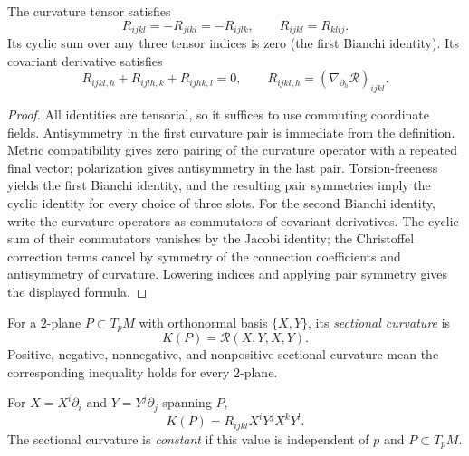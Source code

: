 \begin{lemma}
\label{claim:curvature-symmetries-bianchi}
\leanok
\label{Bianchi}



The curvature tensor satisfies
\[
  R_{ijkl}=-R_{jikl}=-R_{ijlk},
  \qquad R_{ijkl}=R_{klij}.
\]
Its cyclic sum over any three tensor indices is zero (the first Bianchi
identity). Its covariant derivative satisfies
\[
  R_{ijkl,h}+R_{ijlh,k}+R_{ijhk,l}=0,
  \qquad
  R_{ijkl,h}=(\nabla_{\partial_h}\mathcal R)_{ijkl}.
\]
\end{lemma}

\begin{proof}
\sketch
{}
\leanok
All identities are tensorial, so it suffices to use commuting coordinate fields. Antisymmetry in the first curvature pair is immediate from the definition. Metric compatibility gives zero pairing of the curvature operator with a repeated final vector; polarization gives antisymmetry in the last pair. Torsion-freeness yields the first Bianchi identity, and the resulting pair symmetries imply the cyclic identity for every choice of three slots. For the second Bianchi identity, write the curvature operators as commutators of covariant derivatives. The cyclic sum of their commutators vanishes by the Jacobi identity; the Christoffel correction terms cancel by symmetry of the connection coefficients and antisymmetry of curvature. Lowering indices and applying pair symmetry gives the displayed formula.
\end{proof}


\begin{definition}
\label{def:sectional-curvature}
\leanok



For a $2$-plane $P\subset T_pM$ with orthonormal basis $\{X,Y\}$,
its \emph{sectional curvature} is
\[
  K(P)=\mathcal R(X,Y,X,Y).
\]
Positive, negative, nonnegative, and nonpositive sectional curvature
mean the corresponding inequality holds for every $2$-plane.
\end{definition}

For $X=X^i\partial_i$ and $Y=Y^j\partial_j$ spanning $P$,
\[
  K(P)=R_{ijkl}X^iY^jX^kY^l.
\]
The sectional curvature is \emph{constant} if this value is independent
of $p$ and $P\subset T_pM$.

